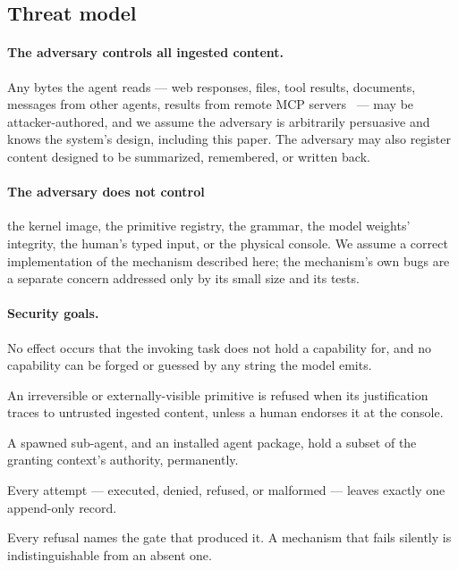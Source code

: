 \documentclass[11pt]{article}
\begin{document}
\subsection{Threat model}
\label{sec:threat}

\paragraph{The adversary controls all ingested content.} Any bytes the agent
reads --- web responses, files, tool results, documents, messages from other
agents, results from remote MCP servers~\cite{mcp2024} --- may be
attacker-authored, and we assume the adversary is arbitrarily persuasive and
knows the system's design, including this paper. The adversary may also
register content designed to be summarized, remembered, or written back.

\paragraph{The adversary does not control} the kernel image, the primitive
registry, the grammar, the model weights' integrity, the human's typed input,
or the physical console. We assume a correct implementation of the mechanism
described here; the mechanism's own bugs are a separate concern addressed only
by its small size and its tests.

\paragraph{Security goals.}
\begin{description}[leftmargin=2.2em,itemsep=1pt]
  \item[\textnormal{\textbf{G1} \emph{No authority without a capability.}}]
  No effect occurs that the invoking task does not hold a capability for, and
  no capability can be forged or guessed by any string the model emits.
  \item[\textnormal{\textbf{G2} \emph{No destructive effect on untrusted
  authority.}}] An irreversible or externally-visible primitive is refused when
  its justification traces to untrusted ingested content, unless a human endorses
  it at the console.
  \item[\textnormal{\textbf{G3} \emph{Delegation only narrows.}}] A spawned
  sub-agent, and an installed agent package, hold a subset of the granting
  context's authority, permanently.
  \item[\textnormal{\textbf{G4} \emph{Total auditability.}}] Every attempt ---
  executed, denied, refused, or malformed --- leaves exactly one append-only
  record.
  \item[\textnormal{\textbf{G5} \emph{Legible fail-closed.}}] Every refusal
  names the gate that produced it. A mechanism that fails silently is
  indistinguishable from an absent one.
\end{description}
\end{document}
